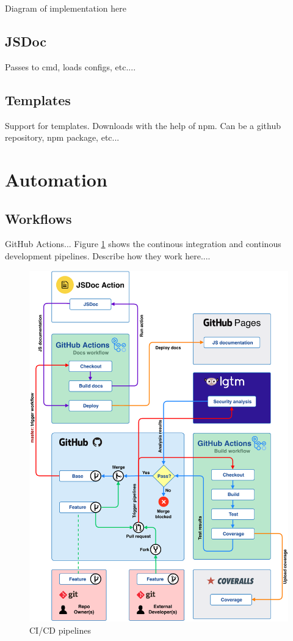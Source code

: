 \colorbox{RubineRed}{Diagram of implementation here}

\subsection{JSDoc}
Passes to cmd, loads configs, etc....

\subsection{Templates}
Support for templates. Downloads with the help of npm. Can be a github repository, npm package, etc...

\section{Automation}
\subsection{Workflows}
GitHub Actions...
Figure \ref{fig:cicd-pipelines} shows the continous integration and continous development pipelines. Describe how they work here....
\begin{figure}[h]
    \setlength{\abovecaptionskip}{25pt}
    \centering
    \includegraphics[page=1,scale=1]{sections/methodology/figures/pipelines.pdf}
    \caption{CI/CD pipelines}
    \label{fig:cicd-pipelines}
\end{figure}
\clearpage

